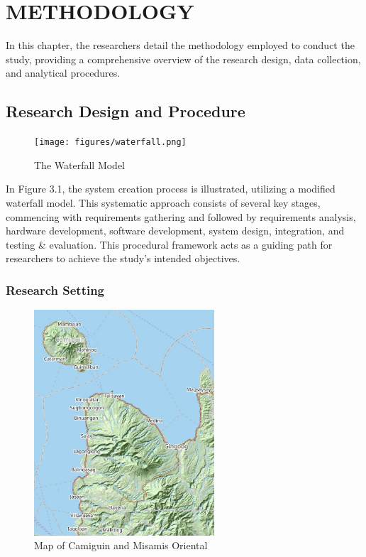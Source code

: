 
\chapter{METHODOLOGY}
{\baselineskip

In this chapter, the researchers detail the methodology employed to conduct the study, providing a comprehensive overview of the research design, data collection, and analytical procedures.

\section{Research Design and Procedure}

\begin{figure}[H]
	\centering
	\caption{The Waterfall Model}
	\label{fig:waterfall}
	\texttt{[image: figures/waterfall.png]}
\end{figure}

In Figure 3.1, the system creation process is illustrated, utilizing a modified waterfall model. This systematic approach consists of several key stages, commencing with requirements gathering and followed by requirements analysis, hardware development, software development, system design, integration, and testing \& evaluation. This procedural framework acts as a guiding path for researchers to achieve the study's intended objectives.


\subsection{Research Setting}

\begin{figure}[H]
	\centering
	\caption{Map of Camiguin and Misamis Oriental}
	\label{fig:map}
	\includegraphics[width=0.6\textwidth]{figures/map.png}
\end{figure}

}
